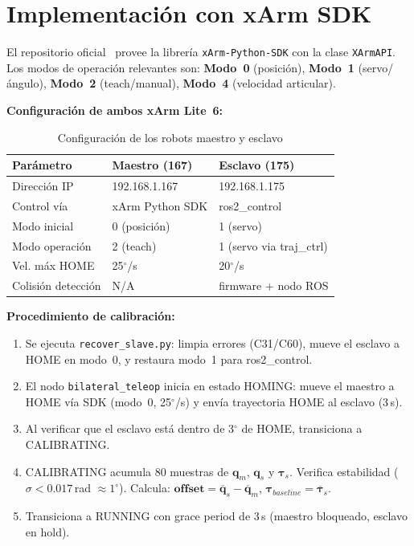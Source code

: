 \documentclass[journal,10pt,twoside]{IEEEtran}
\begin{document}
\section{Implementación con xArm SDK}
\label{sec:implementation}

\begin{theorybox}
  El repositorio oficial~\cite{xarm_github} provee la librería
  \texttt{xArm-Python-SDK} con la clase \texttt{XArmAPI}.
  Los modos de operación relevantes son:
  \textbf{Modo~0} (posición), \textbf{Modo~1} (servo/ángulo),
  \textbf{Modo~2} (teach/manual), \textbf{Modo~4} (velocidad articular).
\end{theorybox}

\textbf{Configuración de ambos xArm Lite~6:}

\begin{table}[h]
\centering
\small
\begin{tabular}{lll}
  \toprule
  \textbf{Parámetro} & \textbf{Maestro (167)} & \textbf{Esclavo (175)} \\
  \midrule
  Dirección IP & 192.168.1.167 & 192.168.1.175 \\
  Control vía & xArm Python SDK & ros2\_control \\
  Modo inicial & 0 (posición) & 1 (servo) \\
  Modo operación & 2 (teach) & 1 (servo via traj\_ctrl) \\
  Vel. máx HOME & 25$^\circ$/s & 20$^\circ$/s \\
  Colisión detección & N/A & firmware + nodo ROS \\
  \bottomrule
\end{tabular}
\caption{Configuración de los robots maestro y esclavo}
\label{tab:xarm_config}
\end{table}

\textbf{Procedimiento de calibración:}
\begin{enumerate}
  \item Se ejecuta \texttt{recover\_slave.py}: limpia errores (C31/C60),
        mueve el esclavo a HOME en modo~0, y restaura modo~1 para
        ros2\_control.
  \item El nodo \texttt{bilateral\_teleop} inicia en estado HOMING:
        mueve el maestro a HOME vía SDK (modo~0, 25$^\circ$/s) y
        envía trayectoria HOME al esclavo (3\,s).
  \item Al verificar que el esclavo está dentro de 3$^\circ$ de HOME,
        transiciona a CALIBRATING.
  \item CALIBRATING acumula 80 muestras de $\bm{q}_m$, $\bm{q}_s$ y
        $\bm{\tau}_s$. Verifica estabilidad ($\sigma < 0{.}017$\,rad
        $\approx 1^\circ$). Calcula:
        $\bm{offset}=\overline{\bm{q}}_s-\overline{\bm{q}}_m$,
        $\bm{\tau}_{baseline}=\overline{\bm{\tau}}_s$.
  \item Transiciona a RUNNING con grace period de 3\,s (maestro
        bloqueado, esclavo en hold).
\end{enumerate}
\end{document}
